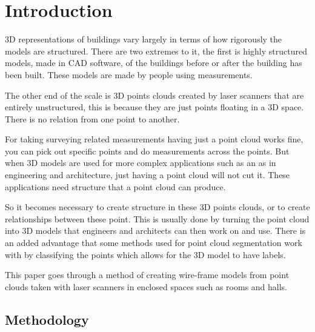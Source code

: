 
\chapter{Introduction}



3D representations of buildings vary largely in terms of how rigorously the models are structured. There are two extremes to it, the first is highly structured models, made in CAD software, of the buildings before or after the building has been built. These models are made by people using measurements.

The other end of the scale is 3D points clouds created by laser scanners that are entirely unstructured, this is because they are just points floating in a 3D space. There is no relation from one point to another.

For taking surveying related measurements having just a point cloud works fine, you can pick out specific points and do measurements across the points. But when 3D models are used for more complex applications such as an as in engineering and architecture, just having a point cloud will not cut it. These applications need structure that a point cloud can produce.

So it becomes necessary to create structure in these 3D points clouds, or to create relationships between these point. This is usually done by turning the point cloud into 3D models that engineers and architects can then work on and use. There is an added advantage that some methods used for point cloud segmentation work with by classifying the points which allows for the 3D model to have labels.



This paper goes through a method of creating wire-frame models from point clouds taken with laser scanners in enclosed spaces such as rooms and halls. 


\section{Methodology}

